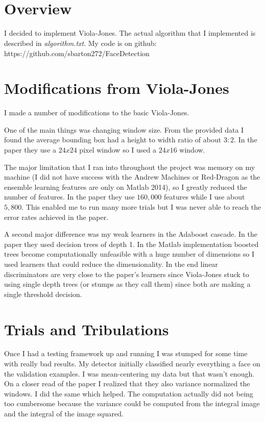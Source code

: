 \documentclass[letterpaper,12pt]{article}
\title{\className \\ \assignmentName}
\author{\myName}
\date{\dueDate}
\begin{document}
\maketitle

\section{Overview}
I decided to implement Viola-Jones. The actual algorithm that I implemented is described in \textit{algorithm.txt}. My code is on github: https://github.com/sbarton272/FaceDetection

\section{Modifications from Viola-Jones}
I made a number of modifications to the basic Viola-Jones.

One of the main things was changing window size. From the provided data I found the average bounding box had a height to width ratio of about $3:2$. In the paper they use a $24x24$ pixel window so I used a $24x16$ window.

The major limitation that I ran into throughout the project was memory on my machine (I did not have success with the Andrew Machines or Red-Dragon as the ensemble learning features are only on Matlab 2014), so I greatly reduced the number of features. In the paper they use $160,000$ features while I use about $5,800$. This enabled me to run many more trials but I was never able to reach the error rates achieved in the paper.

A second major difference was my weak learners in the Adaboost cascade. In the paper they used decision trees of depth 1. In the Matlab implementation boosted trees become computationally unfeasible with a huge number of dimensions so I used learners that could reduce the dimensionality. In the end linear discriminators are very close to the paper's learners since Viola-Jones stuck to using single depth trees (or stumps as they call them) since both are making a single threshold decision.

\section{Trials and Tribulations}
Once I had a testing framework up and running I was stumped for some time with really bad results. My detector initially classified nearly everything a face on the validation examples. I was mean-centering my data but that wasn't enough. On a closer read of the paper I realized that they also variance normalized the windows. I did the same which helped. The computation actually did not being too cumbersome because the variance could be computed from the integral image and the integral of the image squared.
\end{document}
